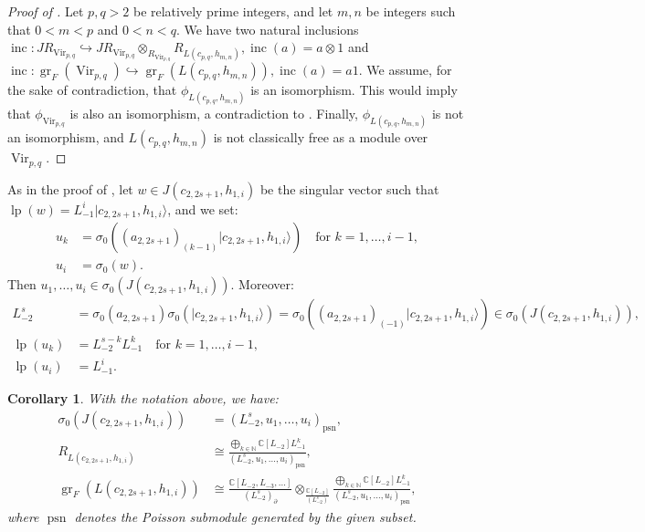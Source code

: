 \documentclass[a4paper, 12pt, reqno]{amsart}
\newtheorem{corollary}[theorem]{Corollary}
\theoremstyle{remark}
\DeclareMathOperator{\Vir}{Vir}
\DeclareMathOperator{\gr}{gr}
\DeclareMathOperator{\lp}{lp}
\DeclareMathOperator{\inc}{inc}
\DeclareMathOperator{\psn}{psn}
\begin{document}
\begin{proof}[Proof of ]
  Let $p, q > 2$ be relatively prime integers, and let $m, n$ be integers such that $0 < m < p$ and $0 < n < q$.
  We have two natural inclusions $\inc: JR_{\Vir_{p, q}} \hookrightarrow JR_{\Vir_{p, q}} \otimes_{R_{\Vir_{p, q}}} R_{L(c_{p, q}, h_{m, n})}, \inc(a) = a \otimes1$ and $\inc: \gr_F(\Vir_{p, q}) \hookrightarrow \gr_F(L(c_{p, q}, h_{m, n})), \inc(a) = a1$.
  We assume, for the sake of contradiction, that $\phi_{L(c_{p, q}, h_{m, n})}$ is an isomorphism.
  This would imply that $\phi_{\Vir_{p, q}}$ is also an isomorphism, a contradiction to .
  Finally, $\phi_{L(c_{p, q}, h_{m, n})}$ is not an isomorphism, and $L(c_{p, q}, h_{m, n})$ is not classically free as a module over $\Vir_{p, q}$.
\end{proof}

As in the proof of , let $w \in J(c_{2, 2s + 1}, h_{1, i})$ be the singular vector such that $\lp(w) = L_{-1}^i|c_{2, 2s + 1}, h_{1, i}\rangle$, and we set:
\begin{align*}
  u_k &= \sigma_0((a_{2, 2s + 1})_{(k - 1)}|c_{2, 2s + 1}, h_{1, i}\rangle) \quad \text{for $k = 1, \dots, i - 1$}, \\
  u_i &= \sigma_0(w).
\end{align*}
Then $u_1, \dots, u_i \in \sigma_0(J(c_{2, 2s + 1}, h_{1, i}))$.
Moreover:
\begin{align*}
  L_{-2}^s &= \sigma_0(a_{2, 2s + 1})\sigma_0(|c_{2, 2s + 1}, h_{1, i}\rangle) = \sigma_0((a_{2, 2s + 1})_{(-1)}|c_{2, 2s + 1}, h_{1, i}\rangle) \in \sigma_0(J(c_{2, 2s + 1}, h_{1, i})), \\
  \lp(u_k) &= L_{-2}^{s - k}L_{-1}^k \quad \text{for $k = 1, \dots, i - 1$}, \\
  \lp(u_i) &= L_{-1}^i.
\end{align*}

\begin{corollary}
  \label{crl:1}
  With the notation above, we have:
  \begin{align}
    \label{eq:12}
    \sigma_0(J(c_{2, 2s + 1}, h_{1, i})) &= (L_{-2}^s, u_1, \dots, u_i)_{\psn}, \\
    \label{eq:13}
    R_{L(c_{2, 2s + 1}, h_{1, i})} &\cong \frac{\bigoplus_{k \in \mathbb{N}}\mathbb{C}[L_{-2}]L_{-1}^k}{(L_{-2}^s, u_1, \dots, u_i)_{\psn}}, \\
    \label{eq:14}
    \gr_F(L(c_{2, 2s + 1}, h_{1, i})) &\cong \frac{\mathbb{C}[L_{-2}, L_{-3}, \dots]}{(L_{-2}^s)_{\partial}} \otimes_{\frac{\mathbb{C}[L_{-2}]}{(L_{-2}^s)}} \frac{\bigoplus_{k \in \mathbb{N}}\mathbb{C}[L_{-2}]L_{-1}^k}{(L_{-2}^s, u_1, \dots, u_i)_{\psn}},
  \end{align}
  where $\psn$ denotes the Poisson submodule generated by the given subset.
\end{corollary}
\end{document}
